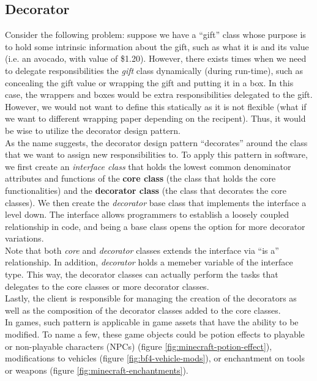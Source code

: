 \begin{multicols}{2}
\subsection{Decorator}

Consider the following problem: suppose we have a ``gift'' class whose purpose is to hold some intrinsic information about the gift, such as what it is and its value (i.e. an avocado, with value of \$1.20). However, there exists times when we need to delegate responsibilities the \textit{gift} class dynamically (during run-time), such as concealing the gift value or wrapping the gift and putting it in a box. In this case, the wrappers and boxes would be extra responsibilities delegated to the gift. However, we would not want to define this statically as it is not flexible (what if we want to different wrapping paper depending on the recipent). Thus, it would be wise to utilize the decorator design pattern.\bs
\\
As the name suggests, the decorator design pattern ``decorates'' around the class that we want to assign new responsibilities to. To apply this pattern in software, we first create an \textit{interface class} that holds the lowest common denominator attributes and functions of the \textbf{core class} (the class that holds the core functionalities) and the \textbf{decorator class} (the class that decorates the core classes). We then create the \textit{decorator} base class that implements the interface a level down. The interface allows programmers to establish a loosely coupled relationship in code, and being a base class opens the option for more decorator variations.\bs
\\
Note that both \textit{core} and \textit{decorator} classes extends the interface via ``is a'' relationship. In addition, \textit{decorator} holds a memeber variable of the interface type. This way, the decorator classes can actually perform the tasks that delegates to the core classes or more decorator classes.\bs
\\
Lastly, the client is responsible for managing the creation of the decorators as well as the composition of the decorator classes added to the core classes.\bs
\\
In games, such pattern is applicable in game assets that have the ability to be modified. To name a few, these game objects could be potion effects to playable or non-playable characters (NPCs) (figure \ref{fig:minecraft-potion-effect})\cite{minecraft-potion}, modifications to vehicles (figure \ref{fig:bf4-vehicle-mods})\cite{bf4-vehicle-mod}, or enchantment on tools or weapons (figure \ref{fig:minecraft-enchantments})\cite{minecraft-enchant}.


\end{multicols}
